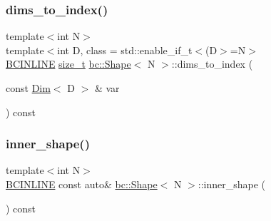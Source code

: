 \mbox{\label{structbc_1_1Shape_a13997bdb38b401a797f411d8630895e7}} 
\subsubsection{\texorpdfstring{dims\+\_\+to\+\_\+index()}{dims\_to\_index()}\hspace{0.1cm}{\footnotesize\ttfamily [2/2]}}
{\footnotesize\ttfamily template$<$int N$>$ \\
template$<$int D, class  = std\+::enable\+\_\+if\+\_\+t$<$(\+D$>$=N$>$ \\
\hyperlink{common_8h_a6699e8b0449da5c0fafb878e59c1d4b1}{B\+C\+I\+N\+L\+I\+NE} \hyperlink{structbc_1_1Shape_a63f974ebdb0e3755ef3140b17abcf235}{size\+\_\+t} \hyperlink{structbc_1_1Shape}{bc\+::\+Shape}$<$ N $>$\+::dims\+\_\+to\+\_\+index (\begin{DoxyParamCaption}\item[{const \hyperlink{structbc_1_1Dim}{Dim}$<$ D $>$ \&}]{var }\end{DoxyParamCaption}) const\hspace{0.3cm}{\ttfamily [inline]}}

\mbox{\label{structbc_1_1Shape_a41fcf9207099d9434a7779e53f91d229}} 
\subsubsection{\texorpdfstring{inner\+\_\+shape()}{inner\_shape()}}
{\footnotesize\ttfamily template$<$int N$>$ \\
\hyperlink{common_8h_a6699e8b0449da5c0fafb878e59c1d4b1}{B\+C\+I\+N\+L\+I\+NE} const auto\& \hyperlink{structbc_1_1Shape}{bc\+::\+Shape}$<$ N $>$\+::inner\+\_\+shape (\begin{DoxyParamCaption}{ }\end{DoxyParamCaption}) const\hspace{0.3cm}{\ttfamily [inline]}}

\mbox{\label{structbc_1_1Shape_ab0f160384387b063fa2198cc0a5b1597}} 
